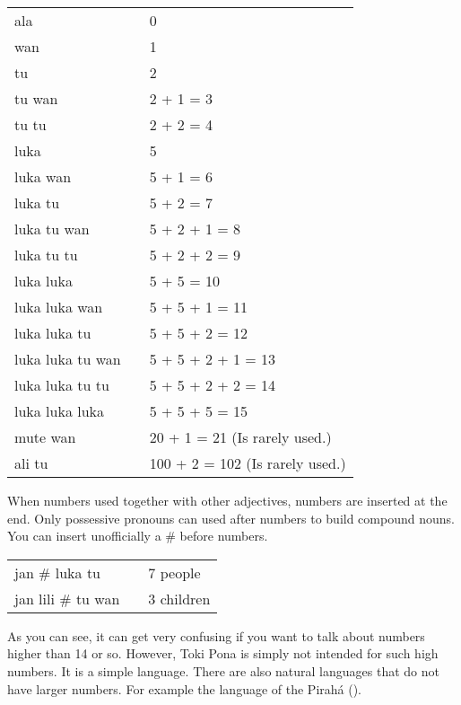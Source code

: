 \begin{supertabular}{p{5,5cm}|ll}
    ala              &  & 0                               \\
    wan              &  & 1                               \\
    tu               &  & 2                               \\
    tu wan           &  & 2 + 1 = 3                       \\
    tu tu            &  & 2 + 2 = 4                       \\
    luka             &  & 5                               \\
    luka wan         &  & 5 + 1 = 6                       \\
    luka tu          &  & 5 + 2 = 7                       \\
    luka tu wan      &  & 5 + 2 + 1 = 8                   \\
    luka tu tu       &  & 5 + 2 + 2 = 9                   \\
    luka luka        &  & 5 + 5 = 10                      \\
    luka luka wan    &  & 5 + 5 + 1 = 11                  \\
    luka luka tu     &  & 5 + 5 + 2 = 12                  \\
    luka luka tu wan &  & 5 + 5 + 2 + 1 = 13              \\
    luka luka tu tu  &  & 5 + 5 + 2 + 2 = 14              \\
    luka luka luka   &  & 5 + 5 + 5 = 15                  \\
    mute wan         &  & 20 + 1 = 21 (Is rarely used.)   \\
    ali tu           &  & 100 + 2 = 102 (Is rarely used.) \\
\end{supertabular}

When numbers used together with other adjectives, numbers are inserted at the end.
Only possessive pronouns can used after numbers to build compound nouns.
You can insert unofficially a \# before numbers.

\begin{supertabular}{p{5,5cm}|ll}
    jan \# luka tu     &  & 7 people   \\
    jan lili \# tu wan &  & 3 children \\
\end{supertabular}

As you can see, it can get very confusing if you want to talk about numbers higher than 14 or so.
However, Toki Pona is simply not intended for such high numbers.
It is a simple language.
There are also natural languages that do not have larger numbers.
For example the language of the Pirah\'{a} (\cite{www:piraha:01}).

